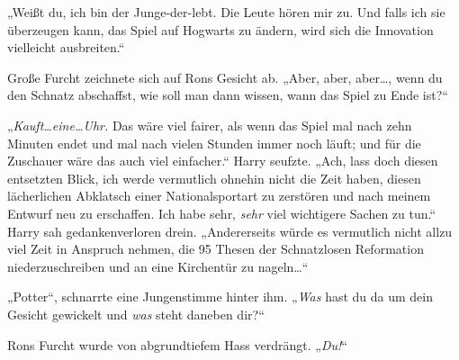 „Weißt du, ich bin der Junge-der-lebt. Die Leute hören mir zu. Und falls ich sie überzeugen kann, das Spiel auf Hogwarts zu ändern, wird sich die Innovation vielleicht ausbreiten.“

Große Furcht zeichnete sich auf Rons Gesicht ab. „Aber, aber, aber…, wenn du den Schnatz abschaffst, wie soll man dann wissen, wann das Spiel zu Ende ist?“

„\emph{Kauft…eine…Uhr.} Das wäre viel fairer, als wenn das Spiel mal nach zehn Minuten endet und mal nach vielen Stunden immer noch läuft; und für die Zuschauer wäre das auch viel einfacher.“ Harry seufzte. „Ach, lass doch diesen entsetzten Blick, ich werde vermutlich ohnehin nicht die Zeit haben, diesen lächerlichen Abklatsch einer Nationalsportart zu zerstören und nach meinem Entwurf neu zu erschaffen. Ich habe sehr, \emph{sehr} viel wichtigere Sachen zu tun.“ Harry sah gedankenverloren drein. „Andererseits würde es vermutlich nicht allzu viel Zeit in Anspruch nehmen, die 95 Thesen der Schnatzlosen Reformation niederzuschreiben und an eine Kirchentür zu nageln…“

„Potter“, schnarrte eine Jungenstimme hinter ihm. „\emph{Was} hast du da um dein Gesicht gewickelt und \emph{was} steht daneben dir?“

Rons Furcht wurde von abgrundtiefem Hass verdrängt. „\emph{Du!}“

